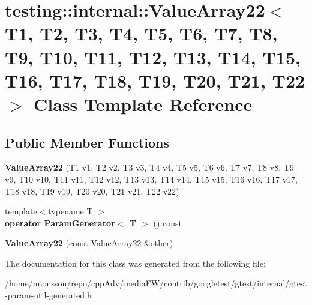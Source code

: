 \hypertarget{classtesting_1_1internal_1_1ValueArray22}{}\section{testing\+:\+:internal\+:\+:Value\+Array22$<$ T1, T2, T3, T4, T5, T6, T7, T8, T9, T10, T11, T12, T13, T14, T15, T16, T17, T18, T19, T20, T21, T22 $>$ Class Template Reference}
\label{classtesting_1_1internal_1_1ValueArray22}
\subsection*{Public Member Functions}
\begin{DoxyCompactItemize}
\item 
\mbox{\label{classtesting_1_1internal_1_1ValueArray22_a65c51cba30994847b9e904edb41dee0e}} 
{\bfseries Value\+Array22} (T1 v1, T2 v2, T3 v3, T4 v4, T5 v5, T6 v6, T7 v7, T8 v8, T9 v9, T10 v10, T11 v11, T12 v12, T13 v13, T14 v14, T15 v15, T16 v16, T17 v17, T18 v18, T19 v19, T20 v20, T21 v21, T22 v22)
\item 
\mbox{\label{classtesting_1_1internal_1_1ValueArray22_aed2e5437d46e87d6de846be6f27ea936}} 
{\footnotesize template$<$typename T $>$ }\\{\bfseries operator Param\+Generator$<$ T $>$} () const
\item 
\mbox{\label{classtesting_1_1internal_1_1ValueArray22_aa1224f9cebb6f87d7ad78ed90b42e77e}} 
{\bfseries Value\+Array22} (const \hyperlink{classtesting_1_1internal_1_1ValueArray22}{Value\+Array22} \&other)
\end{DoxyCompactItemize}


The documentation for this class was generated from the following file\+:\begin{DoxyCompactItemize}
\item 
/home/mjonsson/repo/cpp\+Adv/media\+F\+W/contrib/googletest/gtest/internal/gtest-\/param-\/util-\/generated.\+h\end{DoxyCompactItemize}
